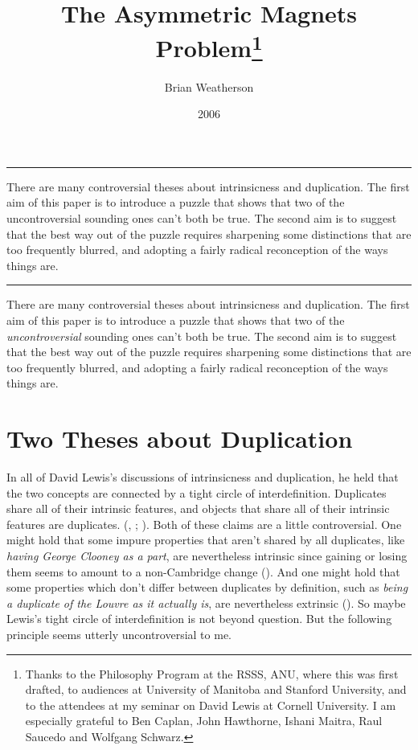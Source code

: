 \documentclass[
  10pt,
  letterpaper,
  DIV=11,
  numbers=noendperiod,
  twoside]{scrartcl}
\title{The Asymmetric Magnets Problem\thanks{Thanks to the Philosophy
Program at the RSSS, ANU, where this was first drafted, to audiences at
University of Manitoba and Stanford University, and to the attendees at
my seminar on David Lewis at Cornell University. I am especially
grateful to Ben Caplan, John Hawthorne, Ishani Maitra, Raul Saucedo and
Wolfgang Schwarz.}}
\author{Brian Weatherson}
\date{2006}
\renewenvironment{abstract}
 {\vspace{-1.25cm}
 \quotation\small\noindent\rule{\linewidth}{.5pt}\par\smallskip
 \noindent }
 {\par\noindent\rule{\linewidth}{.5pt}\endquotation}
\begin{document}
\maketitle
\begin{abstract}
There are many controversial theses about intrinsicness and duplication.
The first aim of this paper is to introduce a puzzle that shows that two
of the uncontroversial sounding ones can't both be true. The second aim
is to suggest that the best way out of the puzzle requires sharpening
some distinctions that are too frequently blurred, and adopting a fairly
radical reconception of the ways things are.
\end{abstract}


There are many controversial theses about intrinsicness and duplication.
The first aim of this paper is to introduce a puzzle that shows that two
of the \emph{uncontroversial} sounding ones can't both be true. The
second aim is to suggest that the best way out of the puzzle requires
sharpening some distinctions that are too frequently blurred, and
adopting a fairly radical reconception of the ways things are.

\section{Two Theses about
Duplication}\label{two-theses-about-duplication}

In all of David Lewis's discussions of intrinsicness and duplication, he
held that the two concepts are connected by a tight circle of
interdefinition. Duplicates share all of their intrinsic features, and
objects that share all of their intrinsic features are duplicates.
(,
;
). Both of these
claims are a little controversial. One might hold that some impure
properties that aren't shared by all duplicates, like \emph{having
George Clooney as a part}, are nevertheless intrinsic since gaining or
losing them seems to amount to a non-Cambridge change
(). And one might
hold that some properties which don't differ between duplicates by
definition, such as \emph{being a duplicate of the Louvre as it actually
is}, are nevertheless extrinsic (). So
maybe Lewis's tight circle of interdefinition is not beyond question.
But the following principle seems utterly uncontroversial to me.
\end{document}
